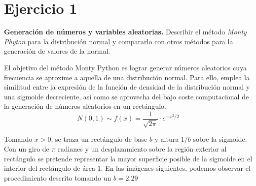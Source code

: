 \documentclass[a4paper,12pt]{article}
\begin{document}
	
	\setlength{\parindent}{0.5cm}
	\setlength{\voffset}{-2cm}
	\setlength{\hoffset}{-2cm}
	
	
	
	
	\tableofcontents
	
\newpage
	\section*{Ejercicio 1}
	\textbf{Generación de números y variables aleatorias.} Describir el método \textit{Monty Phyton} para la distribución normal y compararlo con otros métodos para la generación de valores de la normal.
	
	El objetivo del método Monty Python es lograr generar números aleatorios cuya frecuencia se aproxime a aquella de una distribución normal. Para ello, emplea la similitud entre la expresión de la función de densidad de la distribución normal y una sigmoide decreciente, así como se aprovecha del bajo coste computacional de la generación de números aleatorios en un rectángulo.
	$$ N(0,1) \sim f(x) = \dfrac{1}{\sqrt{2\pi}} \cdot e^{-x^2/2} $$
	
	Tomando $x>0$, se traza un rectángulo de base $b$ y altura $1/b$ sobre la sigmoide. Con un giro de $\pi$ radianes y un desplazamiento sobre la región exterior al rectángulo se pretende representar la mayor superficie posible de la sigmoide en el interior del rectángulo de área $1$. En las imágenes siguientes, podemos observar el procedimiento descrito tomando un $b=2.29$
	
\end{document}
